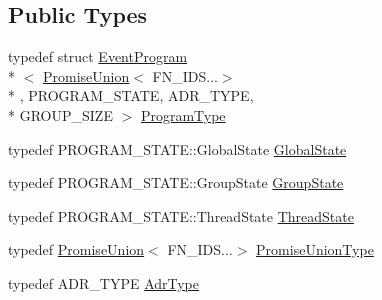 \subsection*{Public Types}
\begin{DoxyCompactItemize}
\item 
typedef struct \hyperlink{structEventProgram}{Event\-Program}\\*
$<$ \hyperlink{unionPromiseUnion}{Promise\-Union}$<$ F\-N\-\_\-\-I\-D\-S...$>$\\*
, P\-R\-O\-G\-R\-A\-M\-\_\-\-S\-T\-A\-T\-E, A\-D\-R\-\_\-\-T\-Y\-P\-E, \\*
G\-R\-O\-U\-P\-\_\-\-S\-I\-Z\-E $>$ \hyperlink{structEventProgram_3_01PromiseUnion_3_01FN__IDS_8_8_8_4_00	PROGRAM__STATE_00	ADR__TYPE_00	GROUP__SIZE_01_4_ade24e2f14ee74ca43ebfa5edfa7571df}{Program\-Type}
\item 
typedef P\-R\-O\-G\-R\-A\-M\-\_\-\-S\-T\-A\-T\-E\-::\-Global\-State \hyperlink{structEventProgram_3_01PromiseUnion_3_01FN__IDS_8_8_8_4_00	PROGRAM__STATE_00	ADR__TYPE_00	GROUP__SIZE_01_4_a6686ae41c222fa163dbe5a3a53983186}{Global\-State}
\item 
typedef P\-R\-O\-G\-R\-A\-M\-\_\-\-S\-T\-A\-T\-E\-::\-Group\-State \hyperlink{structEventProgram_3_01PromiseUnion_3_01FN__IDS_8_8_8_4_00	PROGRAM__STATE_00	ADR__TYPE_00	GROUP__SIZE_01_4_a1b56118a40944d4b1acff1bad3602e47}{Group\-State}
\item 
typedef P\-R\-O\-G\-R\-A\-M\-\_\-\-S\-T\-A\-T\-E\-::\-Thread\-State \hyperlink{structEventProgram_3_01PromiseUnion_3_01FN__IDS_8_8_8_4_00	PROGRAM__STATE_00	ADR__TYPE_00	GROUP__SIZE_01_4_a3b3cb1ee25305cab8a19656538f3d2d6}{Thread\-State}
\item 
typedef \hyperlink{unionPromiseUnion}{Promise\-Union}$<$ F\-N\-\_\-\-I\-D\-S...$>$ \hyperlink{structEventProgram_3_01PromiseUnion_3_01FN__IDS_8_8_8_4_00	PROGRAM__STATE_00	ADR__TYPE_00	GROUP__SIZE_01_4_a1fe05fa4e2892fa52fec81a89acf6cfb}{Promise\-Union\-Type}
\item 
typedef A\-D\-R\-\_\-\-T\-Y\-P\-E \hyperlink{structEventProgram_3_01PromiseUnion_3_01FN__IDS_8_8_8_4_00	PROGRAM__STATE_00	ADR__TYPE_00	GROUP__SIZE_01_4_a7ff844a82bea84a965d52e98850aed64}{Adr\-Type}
\end{DoxyCompactItemize}
